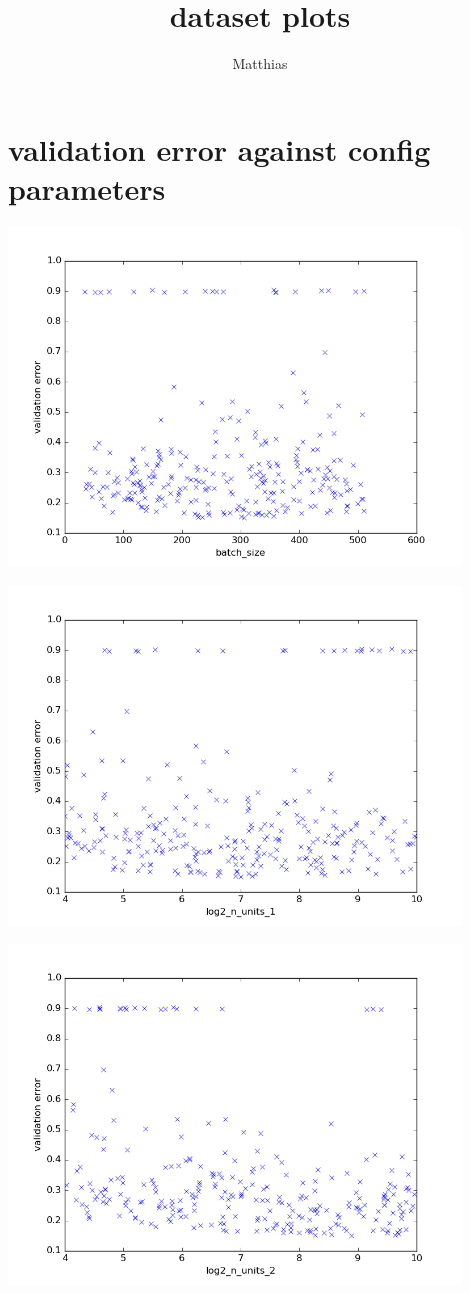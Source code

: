 \documentclass[a4paper,10pt]{article}
\title{dataset plots}
\author{Matthias}
\begin{document}
\maketitle

\section{validation error against config parameters}

\includegraphics[width=0.9\textwidth]{../../figures/batch_size}

\includegraphics[width=0.9\textwidth]{../../figures/log2_n_units_1}

\includegraphics[width=0.9\textwidth]{../../figures/log2_n_units_2}
\end{document}
